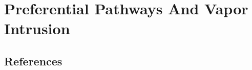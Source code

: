 \documentclass[../thesis.tex]{subfiles}
\begin{document}
\chapter{Preferential Pathways And Vapor Intrusion}



\section{References}
\end{document}
